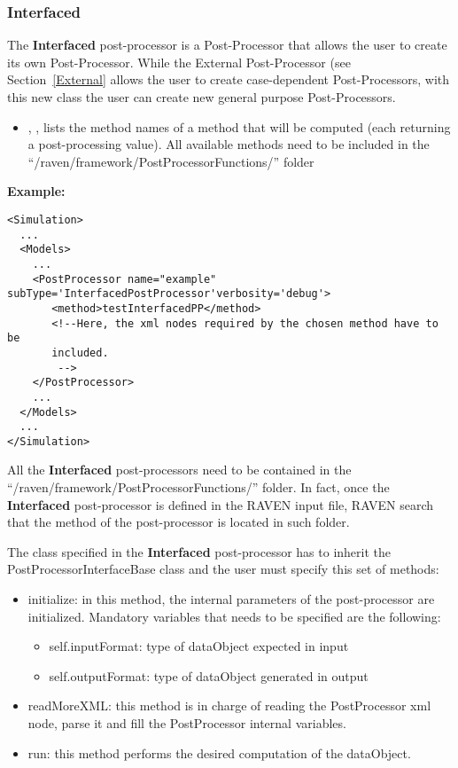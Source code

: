 \subsubsection{Interfaced}
\label{Interfaced}
The \textbf{Interfaced} post-processor is a Post-Processor that allows the user
to create its own Post-Processor. While the External Post-Processor (see
Section~\ref{External} allows the user to create case-dependent
Post-Processors, with this new class the user can create new general
purpose Post-Processors.
%


\begin{itemize}
  \item {}, ,
  lists the method names of a method that will be computed (each
  returning a post-processing value). All available methods need to be included
  in the ``/raven/framework/PostProcessorFunctions/'' folder
\end{itemize}

\textbf{Example:}
\begin{lstlisting}[style=XML,morekeywords={subType,debug,name,class,type}]
<Simulation>
  ...
  <Models>
    ...
    <PostProcessor name="example" subType='InterfacedPostProcessor'verbosity='debug'>
       <method>testInterfacedPP</method>
       <!--Here, the xml nodes required by the chosen method have to be
       included.
        -->
    </PostProcessor>
    ...
  </Models>
  ...
</Simulation>
\end{lstlisting}

All the \textbf{Interfaced} post-processors need to be contained in the
``/raven/framework/PostProcessorFunctions/'' folder. In fact, once the
\textbf{Interfaced} post-processor is defined in the RAVEN input file, RAVEN
search that the method of the post-processor is located in such folder.

The class specified in the \textbf{Interfaced} post-processor has to inherit the
PostProcessorInterfaceBase class and the user must specify this set of
methods:
\begin{itemize}
  \item initialize: in this method, the internal parameters of the
  post-processor are initialized. Mandatory variables that needs to be
  specified are the following:
\begin{itemize}
  \item self.inputFormat: type of dataObject expected in input
  \item self.outputFormat: type of dataObject generated in output
\end{itemize}
  \item readMoreXML: this method is in charge of reading the PostProcessor xml
  node, parse it and fill the PostProcessor internal variables.
  \item run: this method performs the desired computation of the dataObject.
\end{itemize}

